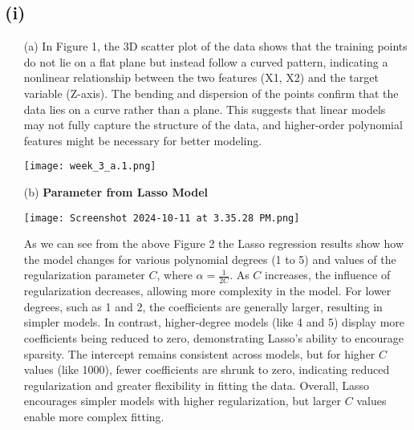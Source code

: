 \documentclass[a4paper,10pt]{article}
\begin{document}
\subsection*{(i)}
\begin{enumerate}
    \item[(a)]   
In Figure 1, the 3D scatter plot of the data shows that the training points do not lie on a flat plane but instead follow a curved pattern, indicating a nonlinear relationship between the two features (X1, X2) and the target variable (Z-axis). The bending and dispersion of the points confirm that the data lies on a curve rather than a plane. This suggests that linear models may not fully capture the structure of the data, and higher-order polynomial features might be necessary for better modeling.
    \begin{center}
        \centering
        \texttt{[image: week\_3\_a.1.png]}
        \label{fig:scatter-3d}
    \end{center} 
\newpage
\item[(b)] \textbf{Parameter from Lasso Model} \\
\begin{center}
        \centering
        \texttt{[image: Screenshot 2024-10-11 at 3.35.28 PM.png]}
        \label{fig:scatter-3d}
    \end{center} 
    
    As we can see from the above Figure 2 the Lasso regression results show how the model changes for various polynomial degrees (1 to 5) and values of the regularization parameter \( C \), where \( \alpha = \frac{1}{2C} \). As \( C \) increases, the influence of regularization decreases, allowing more complexity in the model. For lower degrees, such as 1 and 2, the coefficients are generally larger, resulting in simpler models. In contrast, higher-degree models (like 4 and 5) display more coefficients being reduced to zero, demonstrating Lasso's ability to encourage sparsity. The intercept remains consistent across models, but for higher \( C \) values (like 1000), fewer coefficients are shrunk to zero, indicating reduced regularization and greater flexibility in fitting the data. Overall, Lasso encourages simpler models with higher regularization, but larger \( C \) values enable more complex fitting.


\end{enumerate}
\end{document}
